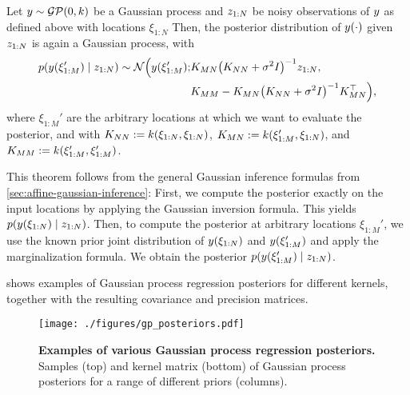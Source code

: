 \documentclass{mimosis}
\begin{document}
\begin{proposition}
\label{prop:batch-gpr}
Let \(\sval \sim \GP(0, \gpcovfun)\) be a Gaussian process and \(z_{1:N}\) be noisy observations of \(y\) as defined above with locations \(\xi_{1:N}\)
Then, the posterior distribution of \(y(\cdot)\) given \(z_{1:N}\) is again a Gaussian process, with
\begin{equation}
\label{eq:gmp:batch-gp-regression}
\begin{split}
  \p(\sval(\xi_{1:M}') \mid \sobs_{1:N}) \sim \N \Big(
    \sval(\xi_{1:M}');
    &\gpcovmat_{MN} \left( \gpcovmat_{NN} + \sigma^2 \eye \right)^{-1} \sobs_{1:N}, \\
    &\gpcovmat_{MM} - \gpcovmat_{MN} \left( \gpcovmat_{NN} + \sigma^2 \eye \right)^{-1} \gpcovmat_{MN}^\T
    \Big),
\end{split}
\end{equation}
where \(\xi_{1:M}'\) are the arbitrary locations at which we want to evaluate the posterior,
and with
\(K_{NN} := k(\xi_{1:N}, \xi_{1:N})\),
\(K_{MN} := k(\xi_{1:M}', \xi_{1:N})\), and
\(K_{MM} := k(\xi_{1:M}', \xi_{1:M}')\).
\end{proposition}


\begin{proofsketch}
This theorem follows from the general Gaussian inference formulas from
\cref{sec:affine-gaussian-inference}:
First, we compute the posterior exactly on the input locations
by applying the Gaussian inversion formula.
This yields \(\p(\sval(\xi_{1:N}) \mid \sobs_{1:N})\).
Then, to compute the posterior at arbitrary locations \(\xi_{1:M}'\),
we use the known prior joint distribution of \(y(\xi_{1:N})\) and \(y(\xi_{1:M}')\) and apply the marginalization formula.
We obtain the posterior \(\p(\sval(\xi_{1:M}') \mid \sobs_{1:N})\).
\end{proofsketch}

 shows examples of Gaussian process regression posteriors for different kernels, together with the resulting covariance and precision matrices.

\begin{figure}[t]
\centering
\texttt{[image: ./figures/gp\_posteriors.pdf]}
\caption{\label{fig:gp_posteriors}\textbf{Examples of various Gaussian process regression posteriors.} Samples (top) and kernel matrix (bottom) of Gaussian process posteriors for a range of different priors (columns).}
\end{figure}
\end{document}
